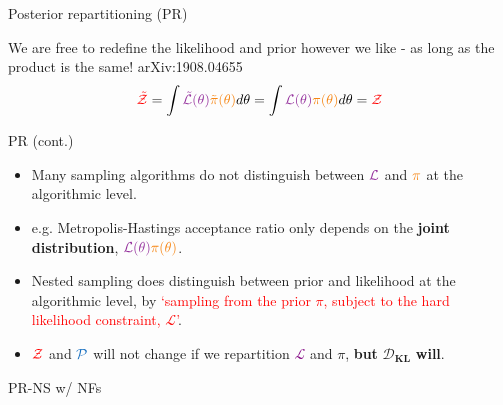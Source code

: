 \documentclass[aspectratio=169, 11pt]{beamer}
\def \bblock{\begin{beamerboxesrounded}[upper=uppercolor,lower=lowercolor,shadow=true]}
\def \eblock{\end{beamerboxesrounded}}
\begin{document}
\begin{frame}{Posterior repartitioning (PR)}
\begin{itemize}
    \bblock{We are free to redefine the likelihood and prior however we like - as long as the product is the same! \textcolor{cfgrey}{arXiv:1908.04655}}
    \centering
    \begin{equation}
        \textcolor{red}{\tilde{\mathcal{Z}}} = \int \textcolor{Purple}{\tilde{\mathcal{L}}(\theta)} \textcolor{BurntOrange}{\tilde{\pi}(\theta)} d\theta = \int \textcolor{Purple}{\mathcal{L}(\theta)} \textcolor{BurntOrange}{\pi(\theta)} d\theta = \textcolor{red}{\mathcal{Z}}
    \end{equation}
\eblock
\end{itemize}

\end{frame}

\begin{frame}{PR (cont.)}
\begin{itemize}

\vfill
     \item Many sampling algorithms do not distinguish between $\textcolor{Purple}{\mathcal{L}}$ and $\textcolor{BurntOrange}{\pi}$ at the algorithmic level.
    \item e.g. Metropolis-Hastings acceptance ratio only depends on the \textbf{joint distribution}, $\textcolor{Purple}{\mathcal{L}(\theta)} \textcolor{BurntOrange}{\pi(\theta)}$.
   \item Nested sampling does distinguish between prior and likelihood at the algorithmic level, by \textcolor{red}{`sampling from the prior $\pi$, subject to the hard likelihood constraint, $\mathcal{L}$'}.
\vfill
\item $\textcolor{red}{\mathcal{Z}}$ and $\textcolor{RoyalBlue}{\mathcal{P}}$ will not change if we repartition \textcolor{Purple}{$\mathcal{L}$} and \textcolor{BurntOrange}{$\pi$}, \textbf{but} $\boldsymbol{\mathcal{D}}_\mathbf{\mathrm{\textbf{KL}}}$ \textbf{will}.
\end{itemize}
\end{frame}

\begin{frame}{PR-NS w/ NFs}
    \centering
    \vfill
    \vfill
\end{frame}
\end{document}

